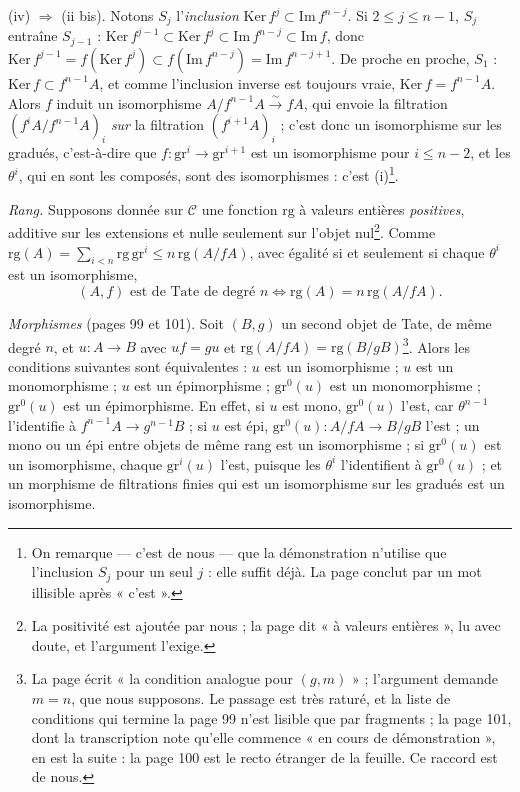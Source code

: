 \documentclass[11pt,a4paper]{article}
\begin{document}
(iv) $\Rightarrow$ (ii bis). Notons $S_j$ l'\emph{inclusion}
$\mathrm{Ker}\, f^{j} \subset \mathrm{Im}\, f^{n-j}$. Si $2 \leq j \leq
n-1$, $S_j$ entraîne $S_{j-1}$ : $\mathrm{Ker}\, f^{j-1} \subset
\mathrm{Ker}\, f^{j} \subset \mathrm{Im}\, f^{n-j} \subset \mathrm{Im}\, f$,
donc $\mathrm{Ker}\, f^{j-1} = f(\mathrm{Ker}\, f^{j}) \subset
f(\mathrm{Im}\, f^{n-j}) = \mathrm{Im}\, f^{n-j+1}$. De proche en proche,
$S_1$ : $\mathrm{Ker}\, f \subset f^{n-1}A$, et comme l'inclusion inverse
est toujours vraie, $\mathrm{Ker}\, f = f^{n-1}A$. Alors $f$ induit un
isomorphisme $A/f^{n-1}A \xrightarrow{\sim} fA$, qui envoie la filtration
$(f^{i}A/f^{n-1}A)_i$ \emph{sur} la filtration $(f^{i+1}A)_i$ ; c'est donc
un isomorphisme sur les gradués, c'est-à-dire que $f \colon
\mathrm{gr}^{i} \to \mathrm{gr}^{i+1}$ est un isomorphisme pour $i \leq
n-2$, et les $\theta^{i}$, qui en sont les composés, sont des
isomorphismes : c'est (i)\footnote{On remarque — c'est de nous — que la
démonstration n'utilise que l'inclusion $S_j$ pour un seul $j$ : elle
suffit déjà. La page conclut par un mot illisible après « c'est ».}.

\emph{Rang.} Supposons donnée sur $\mathcal{C}$ une fonction $\mathrm{rg}$ à
valeurs entières \emph{positives}, additive sur les extensions et nulle
seulement sur l'objet nul\footnote{La positivité est ajoutée par nous ;
la page dit « à valeurs entières », lu avec doute, et l'argument
l'exige.}. Comme $\mathrm{rg}(A) = \sum_{i < n} \mathrm{rg}\,
\mathrm{gr}^{i} \leq n\, \mathrm{rg}(A/fA)$, avec égalité si et seulement
si chaque $\theta^{i}$ est un isomorphisme,
\[
(A, f) \text{ est de Tate de degré } n \iff \mathrm{rg}(A) = n\,
\mathrm{rg}(A/fA).
\]

\emph{Morphismes} (pages 99 et 101). Soit $(B, g)$ un second objet de
Tate, de même degré $n$, et $u \colon A \to B$ avec $u f = g u$ et
$\mathrm{rg}(A/fA) = \mathrm{rg}(B/gB)$\footnote{La page écrit « la
condition analogue pour $(g, m)$ » ; l'argument demande $m = n$, que nous
supposons. Le passage est très raturé, et la liste de conditions qui
termine la page 99 n'est lisible que par fragments ; la page 101, dont la
transcription note qu'elle commence « en cours de démonstration », en est
la suite : la page 100 est le recto étranger de la feuille. Ce
raccord est de nous.}. Alors les conditions suivantes sont
équivalentes : $u$ est un isomorphisme ; $u$ est un monomorphisme ; $u$
est un épimorphisme ; $\mathrm{gr}^{0}(u)$ est un monomorphisme ;
$\mathrm{gr}^{0}(u)$ est un épimorphisme. En effet, si $u$ est mono,
$\mathrm{gr}^{0}(u)$ l'est, car $\theta^{n-1}$ l'identifie à
$f^{n-1}A \to g^{n-1}B$ ; si $u$ est épi, $\mathrm{gr}^{0}(u) \colon A/fA
\to B/gB$ l'est ; un mono ou un épi entre objets de même rang est un
isomorphisme ; si $\mathrm{gr}^{0}(u)$ est un isomorphisme, chaque
$\mathrm{gr}^{i}(u)$ l'est, puisque les $\theta^{i}$ l'identifient à
$\mathrm{gr}^{0}(u)$ ; et un morphisme de filtrations finies qui est un
isomorphisme sur les gradués est un isomorphisme.
\end{document}
